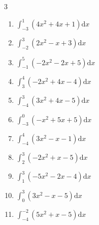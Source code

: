 \begin{multicols}{3}
\begin{enumerate}
  \item $\displaystyle \int_{-3}^{1}\left( 4x^{2}+4x+1 \right) \mathrm{d}x$

        \phantom{$\displaystyle =22$}

  \item $\displaystyle \int_{-2}^{3}\left( 2x^{2}-x+3 \right) \mathrm{d}x$


  \item $\displaystyle \int_{-1}^{5}\left( -2x^{2}-2x+5 \right) \mathrm{d}x$

        \phantom{$\displaystyle =-103$}

\columnbreak %

  \item $\displaystyle \int_{3}^{4}\left( -2x^{2}+4x-4 \right) \mathrm{d}x$


  \item $\displaystyle \int_{-4}^{3}\left( 3x^{2}+4x-5 \right) \mathrm{d}x$


  \item $\displaystyle \int_{-3}^{0}\left( -x^{2}+5x+5 \right) \mathrm{d}x$

        \phantom{$\displaystyle =-29$}

  \item $\displaystyle \int_{-4}^{4}\left( 3x^{2}-x-1 \right) \mathrm{d}x$


  \item $\displaystyle \int_{2}^{3}\left( -2x^{2}+x-5 \right) \mathrm{d}x$

        \phantom{$\displaystyle =-11$}

\columnbreak %

  \item $\displaystyle \int_{1}^{3}\left( -5x^{2}-2x-4 \right) \mathrm{d}x$


  \item $\displaystyle \int_{0}^{3}\left( 3x^{2}-x-5 \right) \mathrm{d}x$

        \phantom{$\displaystyle =20$}

  \item $\displaystyle \int_{-4}^{-2}\left( 5x^{2}+x-5 \right) \mathrm{d}x$


\end{enumerate}
\end{multicols}
